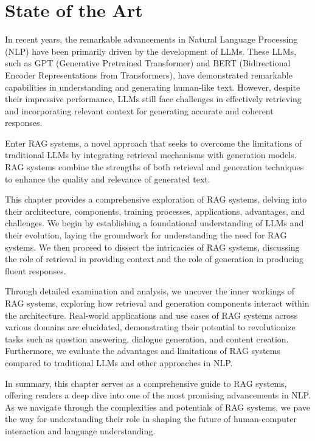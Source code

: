 \chapter{State of the Art}
\graphicspath{{state-of-the-art/figures/}}

In recent years, the remarkable advancements in Natural Language Processing (NLP) have been primarily driven by the development of LLMs. These LLMs, such as GPT (Generative Pretrained Transformer)\cite{openai:gpt} and BERT (Bidirectional Encoder Representations from Transformers)\cite{devlin2019bert}, have demonstrated remarkable capabilities in understanding and generating human-like text. However, despite their impressive performance, LLMs still face challenges in effectively retrieving and incorporating relevant context for generating accurate and coherent responses.

Enter RAG systems, a novel approach that seeks to overcome the limitations of traditional LLMs by integrating retrieval mechanisms with generation models. RAG systems combine the strengths of both retrieval and generation techniques to enhance the quality and relevance of generated text.

This chapter provides a comprehensive exploration of RAG systems, delving into their architecture, components, training processes, applications, advantages, and challenges. We begin by establishing a foundational understanding of LLMs and their evolution, laying the groundwork for understanding the need for RAG systems. We then proceed to dissect the intricacies of RAG systems, discussing the role of retrieval in providing context and the role of generation in producing fluent responses.

Through detailed examination and analysis, we uncover the inner workings of RAG systems, exploring how retrieval and generation components interact within the architecture. Real-world applications and use cases of RAG systems across various domains are elucidated, demonstrating their potential to revolutionize tasks such as question answering, dialogue generation, and content creation. Furthermore, we evaluate the advantages and limitations of RAG systems compared to traditional LLMs and other approaches in NLP.

In summary, this chapter serves as a comprehensive guide to RAG systems, offering readers a deep dive into one of the most promising advancements in NLP. As we navigate through the complexities and potentials of RAG systems, we pave the way for understanding their role in shaping the future of human-computer interaction and language understanding.

